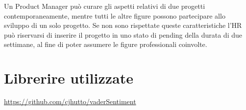 \documentclass[a4paper]{extarticle}
\begin{document}
Un Product Manager può curare gli aspetti relativi di due progetti contemporaneamente, mentre tutti le altre figure possono 
partecipare allo sviluppo di un solo progetto.
Se non sono rispettate queste caratteristiche l'HR può riservarsi di inserire il progetto in uno stato di pending della 
durata di due settimane, al fine di poter assumere le figure professionali coinvolte.


\section{Librerire utilizzate}

\href{Vender}{https://github.com/cjhutto/vaderSentiment}


 
\end{document}
